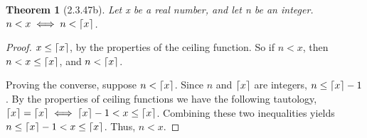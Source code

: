 \documentclass[a4paper, 12pt]{article}
\theoremstyle{plain}
\newtheorem*{theorem*}{Theorem}
\DeclarePairedDelimiter{\ceil}{\lceil}{\rceil}
\begin{document}
	
	\begin{theorem*}[2.3.47b]
		Let x be a real number, and let n be an integer. \newline $n < x \iff n < \ceil{x}$.
	\end{theorem*}
	
	\begin{proof}
		$x \le \ceil{x}$, by the properties of the ceiling function. So if $n < x$, then 
		$n < x \le \ceil{x}$, and $n < \ceil{x}$.
		
		Proving the converse, suppose $n < \ceil{x}$. Since $n$ and $\ceil{x}$ are integers, 
		$n \le \ceil{x} - 1$. By the properties of ceiling functions we have the following 
		tautology, $\ceil{x} = \ceil{x} \iff \ceil{x} - 1 < x \le \ceil{x}$. Combining these 
		two inequalities yields $n \le \ceil{x} - 1 < x \le \ceil{x}$. Thus, $n < x$.
	\end{proof}
\end{document}
